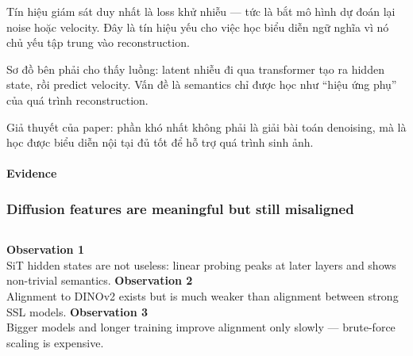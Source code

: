 \begin{frame}[t]
{    Tín hiệu giám sát duy nhất là loss khử nhiễu — tức là bắt mô hình
    dự đoán lại noise hoặc velocity. Đây là tín hiệu yếu cho việc học
    biểu diễn ngữ nghĩa vì nó chủ yếu tập trung vào reconstruction.

    Sơ đồ bên phải cho thấy luồng: latent nhiễu đi qua transformer
    tạo ra hidden state, rồi predict velocity. Vấn đề là semantics
    chỉ được học như ``hiệu ứng phụ'' của quá trình reconstruction.

    Giả thuyết của paper: phần khó nhất không phải là giải bài toán
    denoising, mà là học được biểu diễn nội tại đủ tốt để hỗ trợ
    quá trình sinh ảnh.
  }
\end{frame}

\begin{frame}[t]
  \framesubtitle{Evidence}
  \frametitle{Diffusion features are meaningful but still misaligned}
  \FigTwo[width=\linewidth]
  \vspace{0.08cm}
  \begin{columns}[T,totalwidth=\textwidth]
    {\small \textbf{Observation 1}\\
    SiT hidden states are not useless: linear probing peaks at later
    layers and shows non-trivial semantics.}
    {\small \textbf{Observation 2}\\
    Alignment to DINOv2 exists but is much weaker than alignment
    between strong SSL models.}
    {\small \textbf{Observation 3}\\
    Bigger models and longer training improve alignment only slowly —
    brute-force scaling is expensive.}
  \end{columns}
\end{frame}

